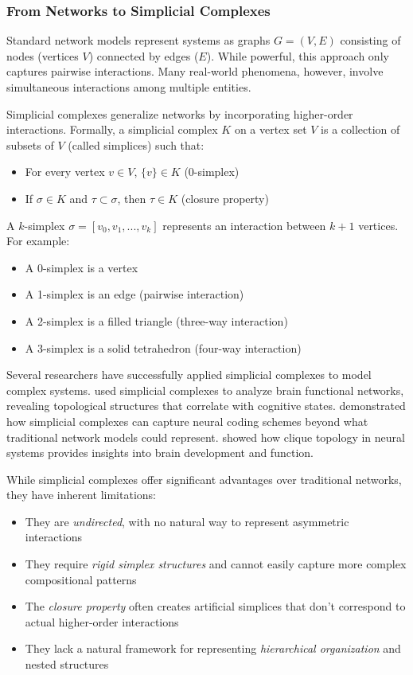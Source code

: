 \subsubsection{From Networks to Simplicial Complexes}
Standard network models represent systems as graphs $G = (V, E)$ consisting of nodes (vertices $V$) connected by edges ($E$). While powerful, this approach only captures pairwise interactions. Many real-world phenomena, however, involve simultaneous interactions among multiple entities.

Simplicial complexes generalize networks by incorporating higher-order interactions. Formally, a simplicial complex $K$ on a vertex set $V$ is a collection of subsets of $V$ (called simplices) such that:
\begin{itemize}
    \item For every vertex $v \in V$, $\{v\} \in K$ (0-simplex)
    \item If $\sigma \in K$ and $\tau \subset \sigma$, then $\tau \in K$ (closure property)
\end{itemize}

A $k$-simplex $\sigma = [v_0, v_1, ..., v_k]$ represents an interaction between $k+1$ vertices. For example:
\begin{itemize}
    \item A 0-simplex is a vertex
    \item A 1-simplex is an edge (pairwise interaction)
    \item A 2-simplex is a filled triangle (three-way interaction)
    \item A 3-simplex is a solid tetrahedron (four-way interaction)
\end{itemize}

Several researchers have successfully applied simplicial complexes to model complex systems. \citet{petri2014homological} used simplicial complexes to analyze brain functional networks, revealing topological structures that correlate with cognitive states. \citet{giusti2016two} demonstrated how simplicial complexes can capture neural coding schemes beyond what traditional network models could represent. \citet{sizemore2018importance} showed how clique topology in neural systems provides insights into brain development and function.

While simplicial complexes offer significant advantages over traditional networks, they have inherent limitations:
\begin{itemize}
    \item They are \textit{undirected}, with no natural way to represent asymmetric interactions
    \item They require \textit{rigid simplex structures} and cannot easily capture more complex compositional patterns
    \item The \textit{closure property} often creates artificial simplices that don't correspond to actual higher-order interactions
    \item They lack a natural framework for representing \textit{hierarchical organization} and nested structures
\end{itemize}

